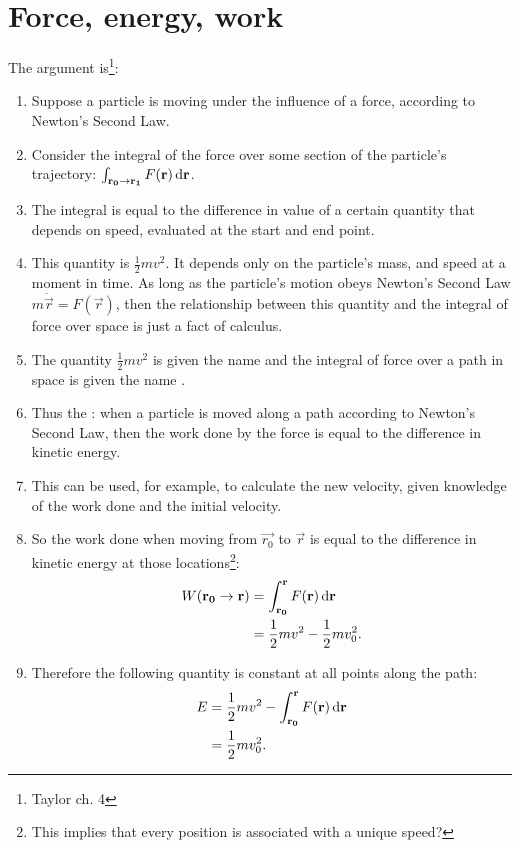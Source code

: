 
\section{Force, energy, work}
The argument is\footnote{Taylor ch. 4}:

\begin{enumerate}
\item Suppose a particle is moving under the influence of a force, according to Newton's Second Law.
\item Consider the integral of the force over some section of the particle's trajectory:
  $\int_{\vec{r_0 \to \vec{r_1}}} F(\vec{r}) \dif \vec{r}$.
\item The integral is equal to the difference in value of a certain quantity that depends on speed,
  evaluated at the start and end point.
\item This quantity is $\frac{1}{2}mv^2$. It depends only on the particle's mass, and speed at a
  moment in time. As long as the particle's motion obeys Newton's Second Law
  $m\ddot{\vec{r}} = F(\vec{r})$, then the relationship between this quantity and the integral of
  force over space is just a fact of calculus.
\item The quantity $\frac{1}{2}mv^2$ is given the name  and the integral of
  force over a path in space is given the name .
\item Thus the : when a particle is moved along a path according to Newton's
  Second Law, then the work done by the force is equal to the difference in kinetic energy.
\item This can be used, for example, to calculate the new velocity, given knowledge of the work done
  and the initial velocity.
\item So the work done when moving from $\vec{r_0}$ to $\vec{r}$ is equal to the difference in
  kinetic energy at those locations\footnote{This implies that every position is associated with a
    unique speed?}:
  \begin{align*}
    W(\vec{r_0} \to \vec{r})
    &= \int_{\vec{r_0}}^{\vec{r}} F(\vec{r}) \dif \vec{r} \\
    &= \frac{1}{2}mv^2 - \frac{1}{2}mv_0^2.
  \end{align*}
\item Therefore the following quantity is constant at all points along the path:
  \begin{align*}
    E
    &= \frac{1}{2}mv^2 - \int_{\vec{r_0}}^{\vec{r}} F(\vec{r}) \dif \vec{r} \\
    &= \frac{1}{2}mv_0^2.
  \end{align*}
\end{enumerate}


